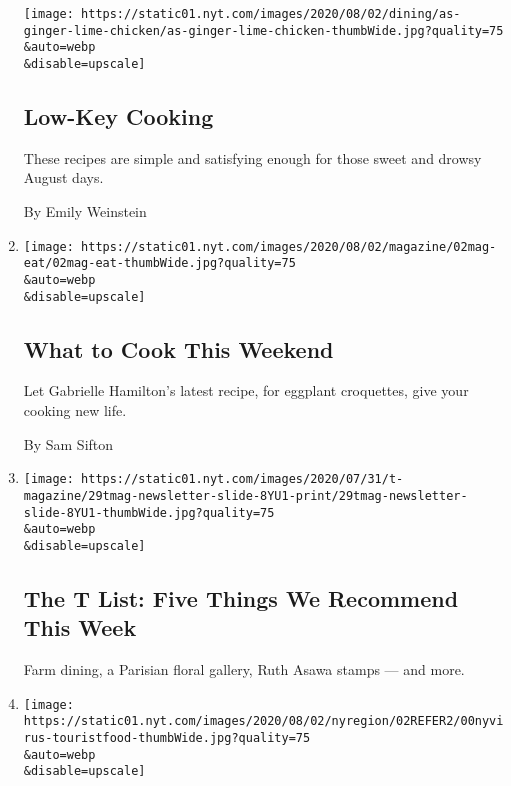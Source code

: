 \begin{enumerate}
  \texttt{[image: https://static01.nyt.com/images/2020/08/02/dining/as-ginger-lime-chicken/as-ginger-lime-chicken-thumbWide.jpg?quality=75\\\&auto=webp\\\&disable=upscale]}

  \hypertarget{low-key-cooking}{%
  \subsection{Low-Key Cooking}\label{low-key-cooking}}

  These recipes are simple and satisfying enough for those sweet and
  drowsy August days.

  By Emily Weinstein
\item
  \href{/2020/07/31/dining/what-to-cook-this-weekend.html}{}

  \texttt{[image: https://static01.nyt.com/images/2020/08/02/magazine/02mag-eat/02mag-eat-thumbWide.jpg?quality=75\\\&auto=webp\\\&disable=upscale]}

  \hypertarget{what-to-cook-this-weekend}{%
  \subsection{What to Cook This
  Weekend}\label{what-to-cook-this-weekend}}

  Let Gabrielle Hamilton's latest recipe, for eggplant croquettes, give
  your cooking new life.

  By Sam Sifton
\item
  \href{/2020/07/30/t-magazine/the-t-list-five-things-we-recommend-this-week.html}{}

  \texttt{[image: https://static01.nyt.com/images/2020/07/31/t-magazine/29tmag-newsletter-slide-8YU1-print/29tmag-newsletter-slide-8YU1-thumbWide.jpg?quality=75\\\&auto=webp\\\&disable=upscale]}

  \hypertarget{the-t-list-five-things-we-recommend-this-week}{%
  \subsection{The T List: Five Things We Recommend This
  Week}\label{the-t-list-five-things-we-recommend-this-week}}

  Farm dining, a Parisian floral gallery, Ruth Asawa stamps --- and
  more.
\item
  \href{/2020/07/30/nyregion/coronavirus-nyc-tourism-restaurants.html}{}

  \texttt{[image: https://static01.nyt.com/images/2020/08/02/nyregion/02REFER2/00nyvirus-touristfood-thumbWide.jpg?quality=75\\\&auto=webp\\\&disable=upscale]}


\end{enumerate}
